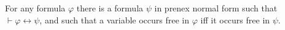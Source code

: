 For any formula $\varphi$ there is a formula $\psi$ in prenex normal form such that $\vdash \varphi \leftrightarrow \psi$, and such that a variable occurs free in $\varphi$ iff it occurs free in $\psi$.
